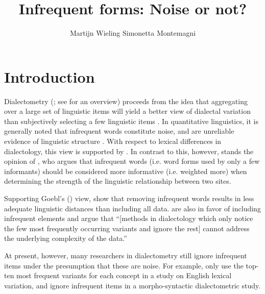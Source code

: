 \documentclass[output=paper]{LSP/langsci}
\author{Martijn Wieling\affiliation{University of Groningen, CLCG} \lastand  Simonetta Montemagni\affiliation{Istituto di Linguistica Computazionale “Antonio Zampolli”, ILC-CNR}}
\title{Infrequent forms: Noise or not?}
\begin{document}
  

 

\section{Introduction}
Dialectometry (\citealt{seguy_relation_1971}; see \citealt{wieling_advances_2015} for an overview) proceeds from the idea that aggregating over a large set of linguistic items will yield a better view of dialectal variation than subjectively selecting a few linguistic items \citep[190--191]{nerbonne_data-driven_2009}.  In quantitative linguistics, it is generally noted that infrequent words constitute noise, and are unreliable evidence of linguistic structure \citep[199]{manning_foundations_1999}. With respect to lexical differences in dialectology, this view is supported by \citet[17]{carver_american_1987}. In contrast to this, however, stands the opinion of \citet[Vol I: 83--86]{goebl_dialektometrische_1984}, who argues that infrequent words (i.e. word forms used by only a few informants) should be considered more informative (i.e. weighted more) when determining the strength of the linguistic relationship between two sites.

Supporting Goebl's (\citeyear{goebl_dialektometrische_1984}) view, \citet{nerbonne_toward_2007} show that removing infrequent words results in less adequate linguistic distances than including all data. \citet[173]{kretzschmar_scaled_2013} are also in favor of including infrequent elements and argue that ``[methods in dialectology which only notice the few most frequently occurring variants and ignore the rest] cannot address the underlying complexity of the data.''

At present, however, many researchers in dialectometry still ignore infrequent items under the presumption that these are noise. For example, \citet{wieling_analyzing_2014} only use the top-ten most frequent variants for each concept in a study on English lexical variation, and \citet{szmrecsanyi_corpus-based_2011} ignore infrequent items in a morpho-syntactic dialectometric study. 
\end{document}
